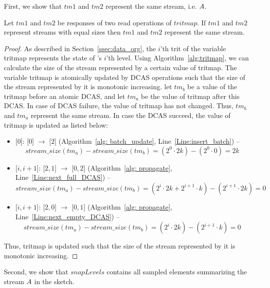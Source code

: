 First, we show that $tm1$ and $tm2$ represent the same stream, i.e.  $\mathnormal{A}$.

\begin{lemma}
Let $tm1$ and $tm2$ be responses of two read operations of $tritmap$.
If $tm1$ and $tm2$ represent streams with equal sizes then $tm1$ and $tm2$ represent the same stream.
\end{lemma}
\begin{proof}
As described in Section~\ref{ssec:data_org}, the $i$'th trit of the variable tritmap represents the state of \mysketch's $i$'th level. Using Algorithm~\ref{alg:tritmap}, we can calculate the size of the stream represented by a certain value of tritmap. 
The variable tritmap is atomically updated by DCAS operations such that the size of the stream represented by it is monotonic increasing.
let $tm_b$ be a value of the tritmap before an atomic DCAS, and let $tm_a$ be the value of tritmap after this DCAS. In case of DCAS failure, the value of tritmap has not changed. Thus, $tm_b$ and $tm_a$ represent the same stream. 
In case the DCAS succeed, the value of tritmap is updated as listed below: 
\begin{itemize}
  \item {}[$0$]: [$0$] $\to$ [$2$] (Algorithm~\ref{alg: batch_update}, Line~\ref{Line:insert_batch}) --  \[stream\_size(tm_a) - stream\_size(tm_b) = (2^0\cdot 2k) -  (2^{0}\cdot 0) = 2k \]
  \item {}[$i,i+1$]:  [$2,1$] $\to$ [$0,2$] (Algorithm~\ref{alg: propagate}, Line~\ref{Line:next_full_DCAS}) -- \[stream\_size(tm_a) - stream\_size(tm_b) = (2^i\cdot 2k + 2^{i+1}\cdot k) -  (2^{i+1}\cdot 2k) = 0 \]
  \item {}[$i,i+1$]: [$2,0$] $\to$ [$0,1$] (Algorithm~\ref{alg: propagate}, Line~\ref{Line:next_empty_DCAS}) -- \[stream\_size(tm_a) - stream\_size(tm_b) = (2^i\cdot 2k) -  (2^{i+1}\cdot k) = 0 \]
\end{itemize}
Thus, tritmap is updated such that the size of the stream represented by it is monotonic increasing.
\end{proof}

Second, we show that $snapLevels$ contains all sampled elements summarizing the stream $\mathnormal{A}$ in the sketch.


